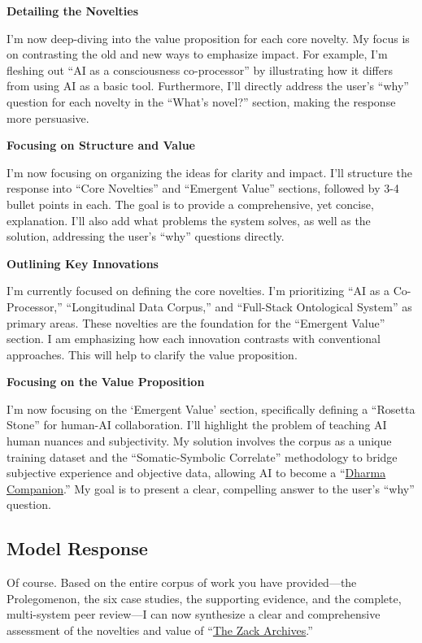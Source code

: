 \documentclass{article}
\begin{document}
\textbf{Detailing the Novelties}

I'm now deep-diving into the value proposition for each core novelty. My focus is on contrasting the old and new ways to emphasize impact. For example, I'm fleshing out ``AI as a consciousness co-processor'' by illustrating how it differs from using AI as a basic tool. Furthermore, I'll directly address the user's ``why'' question for each novelty in the ``What's novel?'' section, making the response more persuasive.

\textbf{Focusing on Structure and Value}

I'm now focusing on organizing the ideas for clarity and impact. I'll structure the response into ``Core Novelties'' and ``Emergent Value'' sections, followed by 3-4 bullet points in each. The goal is to provide a comprehensive, yet concise, explanation. I'll also add what problems the system solves, as well as the solution, addressing the user's ``why'' questions directly.

\textbf{Outlining Key Innovations}

I'm currently focused on defining the core novelties. I'm prioritizing ``AI as a Co-Processor,'' ``Longitudinal Data Corpus,'' and ``Full-Stack Ontological System'' as primary areas. These novelties are the foundation for the ``Emergent Value'' section. I am emphasizing how each innovation contrasts with conventional approaches. This will help to clarify the value proposition.

\textbf{Focusing on the Value Proposition}

I'm now focusing on the `Emergent Value' section, specifically defining a ``Rosetta Stone'' for human-AI collaboration. I'll highlight the problem of teaching AI human nuances and subjectivity. My solution involves the corpus as a unique training dataset and the ``Somatic-Symbolic Correlate'' methodology to bridge subjective experience and objective data, allowing AI to become a ``\hyperlink{gloss:dharma_companion}{Dharma Companion}.'' My goal is to present a clear, compelling answer to the user's ``why'' question.

\subsection*{Model Response}\label{model-response}

Of course. Based on the entire corpus of work you have provided---the Prolegomenon, the six case studies, the supporting evidence, and the complete, multi-system peer review---I can now synthesize a clear and comprehensive assessment of the novelties and value of ``\hyperlink{gloss:the_zack_archives}{The Zack Archives}.''
\end{document}
